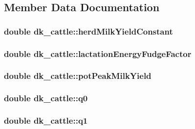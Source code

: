 \subsection{Member Data Documentation}
\hypertarget{classdk__cattle_ae6e782886cf7ce9d85442ee0f531e665}{
\subsubsection[{herdMilkYieldConstant}]{\setlength{\rightskip}{0pt plus 5cm}double {\bf dk\_\-cattle::herdMilkYieldConstant}}}
\label{classdk__cattle_ae6e782886cf7ce9d85442ee0f531e665}
\hypertarget{classdk__cattle_af0fd0845b1b42563e7a5395c7131cf7a}{
\subsubsection[{lactationEnergyFudgeFactor}]{\setlength{\rightskip}{0pt plus 5cm}double {\bf dk\_\-cattle::lactationEnergyFudgeFactor}}}
\label{classdk__cattle_af0fd0845b1b42563e7a5395c7131cf7a}
\hypertarget{classdk__cattle_ace4c1d37bba3bfc12ced3fb03c0d1308}{
\subsubsection[{potPeakMilkYield}]{\setlength{\rightskip}{0pt plus 5cm}double {\bf dk\_\-cattle::potPeakMilkYield}}}
\label{classdk__cattle_ace4c1d37bba3bfc12ced3fb03c0d1308}
\hypertarget{classdk__cattle_ae3e29008dabce4e25f23783c7152e3c2}{
\subsubsection[{q0}]{\setlength{\rightskip}{0pt plus 5cm}double {\bf dk\_\-cattle::q0}}}
\label{classdk__cattle_ae3e29008dabce4e25f23783c7152e3c2}
\hypertarget{classdk__cattle_a4ef5cf4c301adad64cc28f234fdc4419}{
\subsubsection[{q1}]{\setlength{\rightskip}{0pt plus 5cm}double {\bf dk\_\-cattle::q1}}}
\label{classdk__cattle_a4ef5cf4c301adad64cc28f234fdc4419}


